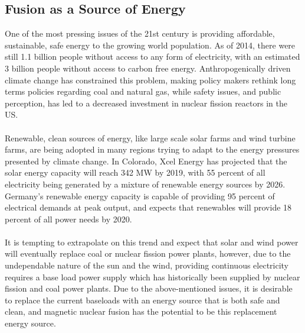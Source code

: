 \documentclass{article}
\begin{document}
\subsection{Fusion as a Source of Energy}
One of the most pressing issues of the 21st century is providing affordable, sustainable, safe energy to the growing world population. As of 2014, there were still 1.1 billion people without access to any form of electricity, with an estimated 3 billion people without access to carbon free energy. Anthropogenically driven climate change has constrained this problem, making policy makers rethink long terms policies regarding coal and natural gas, while safety issues, and public perception, has led to a decreased investment in nuclear fission reactors in the US.\\
\\
Renewable, clean sources of energy, like large scale solar farms and wind turbine farms, are being adopted in many regions trying to adapt to the energy pressures presented by climate change. In Colorado, Xcel Energy has projected that the solar energy capacity will reach 342 MW by 2019, with 55 percent of all electricity being generated by a mixture of renewable energy sources by 2026. Germany's renewable energy capacity is capable of providing 95 percent of electrical demands at peak output, and expects that renewables will provide 18 percent of all power needs by 2020.\\
\\
It is tempting to extrapolate on this trend and expect that solar and wind power will eventually replace coal or nuclear fission power plants, however, due to the undependable nature of the sun and the wind, providing continuous electricity requires a base load power supply which has historically been supplied by nuclear fission and coal power plants. Due to the above-mentioned issues, it is desirable to replace the current baseloads with an energy source that is both safe and clean, and magnetic nuclear fusion has the potential to be this replacement energy source.\\
\\
\end{document}

